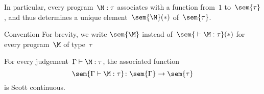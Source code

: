 \begin{frame}
  In particular, every program~$\M:\tau$ associates with a function from~$1$
  to~$\sem{\tau}$, and thus determines a unique element~$\sem{\M}(*)$
  of~$\sem{\tau}$. 
  \begin{block}{Convention}
    For brevity, we write $\sem{\M}$ instead of~$\sem{{}\vdash\M : \tau}(*)$ for
    every program~$\M$ of type~$\tau$
  \end{block}
  \begin{theorem}
    For every judgement~$\Gamma \vdash \M:\tau$, 
    the associated function
    \[
      \sem{\Gamma \vdash \M : \tau} \colon \sem{\Gamma} \to \sem{\tau}
    \]
    is Scott continuous. 
  \end{theorem}
\end{frame}


